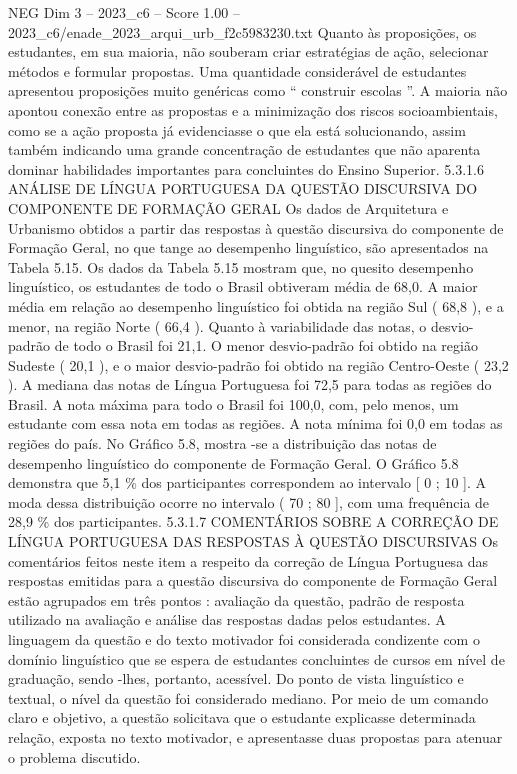 \begin{textsample}{NEG Dim 3 – 2023\_c6 – Score 1.00 – 2023\_c6/enade\_2023\_arqui\_urb\_f2c5983230.txt}
Quanto às proposições, os estudantes, em sua maioria, não souberam criar estratégias de ação, selecionar métodos e formular propostas.
Uma quantidade considerável de estudantes apresentou proposições muito genéricas como “ construir escolas ”.
A maioria não apontou conexão entre as propostas e a minimização dos riscos socioambientais, como se a ação proposta já evidenciasse o que ela está solucionando, assim também indicando uma grande concentração de estudantes que não aparenta dominar habilidades importantes para concluintes do Ensino Superior. 5.3.1.6 ANÁLISE DE LÍNGUA PORTUGUESA DA QUESTÃO DISCURSIVA DO COMPONENTE DE FORMAÇÃO GERAL Os dados de Arquitetura e Urbanismo obtidos a partir das respostas à questão discursiva do componente de Formação Geral, no que tange ao desempenho linguístico, são apresentados na Tabela 5.15.
Os dados da Tabela 5.15 mostram que, no quesito desempenho linguístico, os estudantes de todo o Brasil obtiveram média de 68,0.
A maior média em relação ao desempenho linguístico foi obtida na região Sul ( 68,8 ), e a menor, na região Norte ( 66,4 ).
Quanto à variabilidade das notas, o desvio-padrão de todo o Brasil foi 21,1.
O menor desvio-padrão foi obtido na região Sudeste ( 20,1 ), e o maior desvio-padrão foi obtido na região Centro-Oeste ( 23,2 ).
A mediana das notas de Língua Portuguesa foi 72,5 para todas as regiões do Brasil.
A nota máxima para todo o Brasil foi 100,0, com, pelo menos, um estudante com essa nota em todas as regiões.
A nota mínima foi 0,0 em todas as regiões do país.
No Gráfico 5.8, mostra -se a distribuição das notas de desempenho linguístico do componente de Formação Geral.
O Gráfico 5.8 demonstra que 5,1 \% dos participantes correspondem ao intervalo [ 0 ; 10 ].
A moda dessa distribuição ocorre no intervalo ( 70 ; 80 ], com uma frequência de 28,9 \% dos participantes. 5.3.1.7 COMENTÁRIOS SOBRE A CORREÇÃO DE LÍNGUA PORTUGUESA DAS RESPOSTAS À QUESTÃO DISCURSIVAS Os comentários feitos neste item a respeito da correção de Língua Portuguesa das respostas emitidas para a questão discursiva do componente de Formação Geral estão agrupados em três pontos : avaliação da questão, padrão de resposta utilizado na avaliação e análise das respostas dadas pelos estudantes.
A linguagem da questão e do texto motivador foi considerada condizente com o domínio linguístico que se espera de estudantes concluintes de cursos em nível de graduação, sendo -lhes, portanto, acessível.
Do ponto de vista linguístico e textual, o nível da questão foi considerado mediano.
Por meio de um comando claro e objetivo, a questão solicitava que o estudante explicasse determinada relação, exposta no texto motivador, e apresentasse duas propostas para atenuar o problema discutido.

\end{textsample}
